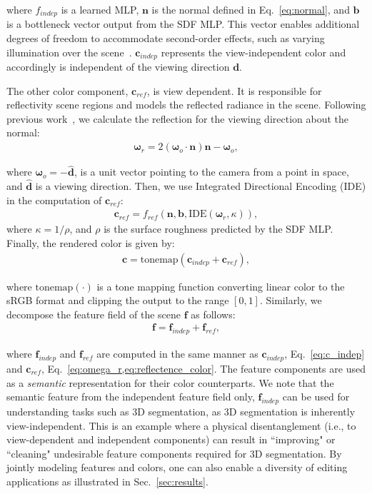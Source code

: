 \noindent where $f_{indep}$ is a learned MLP, $\mathbf{n}$ is the normal defined in Eq.~\ref{eq:normal}, and $\mathbf{b}$ is a bottleneck vector output from the SDF MLP. This vector enables additional degrees of freedom to accommodate second-order effects, such as varying illumination over the scene~\cite{verbin2022refnerf, wang2023unisdf}. $\mathbf{c}_{indep}$ represents the view-independent color and accordingly is independent of the viewing direction $\mathbf{d}$.

The other color component, $\mathbf{c}_{ref}$, is view dependent. It is responsible for reflectivity scene regions and models the reflected radiance in the scene. Following previous work~\cite{verbin2022refnerf}, we calculate the reflection for the viewing direction about the normal:
\begin{align} \label{eq:omega_r}
\mathbf{\omega}_r = 2(\mathbf{\omega}_o \cdot \mathbf{n}) \mathbf{n} - \mathbf{\omega}_o,
\end{align}

\noindent where $\mathbf{\omega}_o = -\mathbf{\hat{d}}$, is a unit vector pointing to the camera from a point in
space, and $\mathbf{\hat{d}}$ is a viewing direction. Then, we use Integrated Directional Encoding (IDE) \cite{verbin2022refnerf} in the computation of $\mathbf{c}_{ref}$:
\begin{align} \label{eq:reflectence_color}
\mathbf{c}_{ref} = f_{ref}(\mathbf{n}, \mathbf{b}, \text{IDE}(\mathbf{\omega}_r, \kappa)),
\end{align}
\noindent where $\kappa = 1/\rho$, and $\rho$ is the surface roughness predicted by the SDF MLP. 
Finally, the rendered color is given by:
\begin{align}
\mathbf{c} = \text{tonemap}(\mathbf{c}_{indep} + \mathbf{c}_{ref}),
\label{eq:learnable_weights_1}
\end{align}

\noindent where $\text{tonemap}(\cdot)$ is a tone mapping function converting linear color to the sRGB format and clipping the output to the range $[0, 1]$. Similarly, we decompose the feature field of the scene $\mathbf{f}$ as follows:
\begin{align}
\mathbf{f} = \mathbf{f}_{indep} + \mathbf{f}_{ref},
\label{eq:learnable_weights_2}
\end{align}

\noindent where $\mathbf{f}_{indep}$ and $\mathbf{f}_{ref}$ are computed in the same manner as $\mathbf{c}_{indep}$, Eq.~\ref{eq:c_indep} and $\mathbf{c}_{ref}$, Eq.~\cref{eq:omega_r,eq:reflectence_color}. The feature components are used as a \textit{semantic} representation for their color counterparts. We note that the semantic feature from the independent feature field only, $\mathbf{f}_{indep}$ can be used for understanding tasks such as 3D segmentation, as 3D segmentation is inherently view-independent. This is an example where a physical disentanglement (i.e., to view-dependent and independent components) can result in ``improving" or ``cleaning" undesirable feature components required for 3D segmentation. By jointly modeling features and colors, one can also enable a diversity of editing applications as illustrated in Sec.~\ref{sec:results}. 


